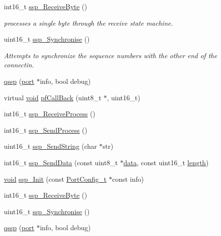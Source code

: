 \begin{DoxyCompactItemize}
int16\-\_\-t \hyperlink{classqssp_gae06a33d9cc36f1b95bb0bc0a5ab8ca3a}{ssp\-\_\-\-Receive\-Byte} ()
\begin{DoxyCompactList}\small\item\em processes a single byte through the receive state machine. \end{DoxyCompactList}\item 
uint16\-\_\-t \hyperlink{classqssp_ga6f47e7cf74215ceeaf3d6234ef0c37b7}{ssp\-\_\-\-Synchronise} ()
\begin{DoxyCompactList}\small\item\em Attempts to synchronize the sequence numbers with the other end of the connectin. \end{DoxyCompactList}\item 
\hyperlink{classqssp_ga6b7f70326e497709fc513c3d122379cb}{qssp} (\hyperlink{classport}{port} $\ast$info, bool debug)
\item 
virtual \hyperlink{group___u_a_v_objects_plugin_ga444cf2ff3f0ecbe028adce838d373f5c}{void} \hyperlink{group___uploader_ga28dc454e607c69686bf4df989ad3d1ae}{pf\-Call\-Back} (uint8\-\_\-t $\ast$, uint16\-\_\-t)
\item 
int16\-\_\-t \hyperlink{group___uploader_ga11e7402dcc0d8efde83d13592279f122}{ssp\-\_\-\-Receive\-Process} ()
\item 
int16\-\_\-t \hyperlink{group___uploader_gaa1b44e385ddf057c81585809dc71e4ba}{ssp\-\_\-\-Send\-Process} ()
\item 
uint16\-\_\-t \hyperlink{group___uploader_ga53a085c64c9a0e54a10cefe2ce660714}{ssp\-\_\-\-Send\-String} (char $\ast$str)
\item 
int16\-\_\-t \hyperlink{group___uploader_gae129d1cdf9ba386b6cd8002176a35a3b}{ssp\-\_\-\-Send\-Data} (const uint8\-\_\-t $\ast$\hyperlink{glext_8h_a8850df0785e6fbcc2351af3b686b8c7a}{data}, const uint16\-\_\-t \hyperlink{glext_8h_a3c8469415bbc83dd1341af15c67f1cef}{length})
\item 
\hyperlink{group___u_a_v_objects_plugin_ga444cf2ff3f0ecbe028adce838d373f5c}{void} \hyperlink{group___uploader_gaa7efad31d36502cca3aab3e4eed10d12}{ssp\-\_\-\-Init} (const \hyperlink{struct_port_config__t}{Port\-Config\-\_\-t} $\ast$const info)
\item 
int16\-\_\-t \hyperlink{group___uploader_gae06a33d9cc36f1b95bb0bc0a5ab8ca3a}{ssp\-\_\-\-Receive\-Byte} ()
\item 
uint16\-\_\-t \hyperlink{group___uploader_ga6f47e7cf74215ceeaf3d6234ef0c37b7}{ssp\-\_\-\-Synchronise} ()
\item 
\hyperlink{group___uploader_ga6b7f70326e497709fc513c3d122379cb}{qssp} (\hyperlink{classport}{port} $\ast$info, bool debug)
\end{DoxyCompactItemize}


